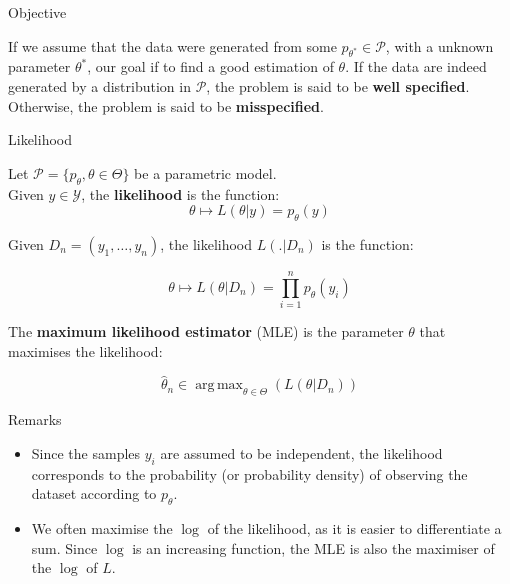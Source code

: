 \documentclass[usenames,dvipsnames]{beamer}
\DeclareMathOperator*{\argmax}{arg\,max}
\begin{document}
\begin{frame}{Objective}

If we assume that the data were generated from some $p_{\theta^*}\in \mathcal{P} $, with a unknown parameter $ \theta^*$, our goal if to find a good estimation of $\theta$. If the data are indeed generated by a distribution in $ \mathcal{P} $, the problem is said to be \textbf{{well specified}}. Otherwise, the problem is said to be \textbf{{misspecified}}.
    
\end{frame}


\begin{frame}

\begin{definition}{Likelihood}

    Let $\mathcal{P}  = \{p_{\theta},\theta \in \Theta \}$ be a parametric model.
    \\

    Given $y\in \mathcal{Y} $, the \textbf{{likelihood}} is the function:
    \begin{equation}
	\theta\mapsto L(\theta|y) = p_{\theta}(y)
    	\end{equation}

     Given $D_n = (y_1, \dots, y_n)$, the likelihood $L(.|D_n)$ is the function:

    \begin{equation}
	\theta \mapsto L(\theta|D_n)= \prod^{n}_{i=1} p_{\theta}(y_i)
    \end{equation}

    The \textbf{{maximum likelihood estimator}}  (MLE) is the parameter $\theta$ that maximises the likelihood:

    \begin{equation}
	\hat{\theta}_n \in \argmax_{\theta\in \Theta}(L(\theta|D_n))
    \end{equation}

\end{definition}
    
\end{frame}

\begin{frame}{Remarks}
    \begin{itemize}
	\item Since the samples $y_i$ are assumed to be independent, the likelihood corresponds to the probability (or probability density) of observing the dataset according to $p_{\theta}$.
	\item We often maximise the $\log$ of the likelihood, as it is easier to differentiate a sum. Since $\log$ is an increasing function, the MLE is also the maximiser of the $\log$ of $L$.
    \end{itemize}
\end{frame}
\end{document}
